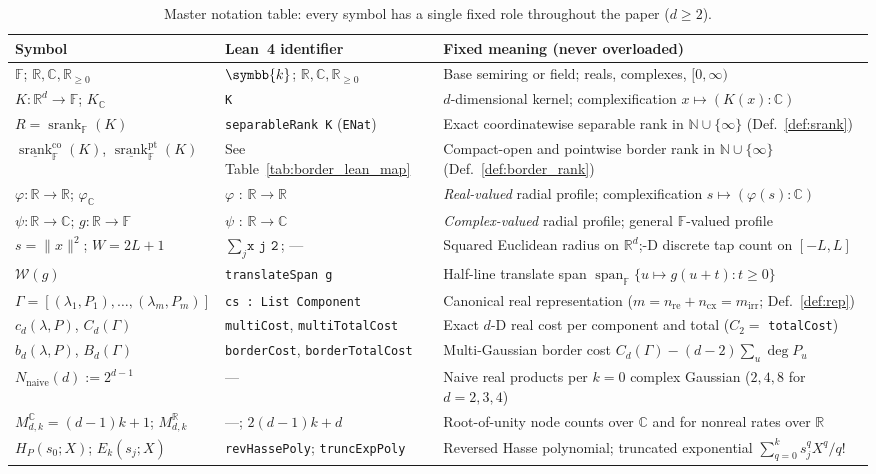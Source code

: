 \documentclass[11pt,a4paper]{article}
\theoremstyle{plain}
\theoremstyle{definition}
\newcommand{\R}{\mathbb{R}}
\newcommand{\C}{\mathbb{C}}
\newcommand{\N}{\mathbb{N}}
\newcommand{\Field}{\mathbb{F}}
\newcommand{\Rnn}{\mathbb{R}_{\ge 0}}
\newcommand{\Nnaive}{N_{\mathrm{naive}}}
\DeclareMathOperator{\srank}{srank}
\DeclareMathOperator{\spanop}{span}
\begin{document}
\begin{table}[t]
\centering
\caption{Master notation table: every symbol has a single fixed role throughout the paper ($d \ge 2$).}\label{tab:glossary}
\smallskip
{\scriptsize\setlength{\tabcolsep}{2.2pt}
\begin{tabular}{@{}ll>{\raggedright\arraybackslash}p{6.8cm}@{}}
\toprule
Symbol & Lean~4 identifier & Fixed meaning (never overloaded) \\
\midrule
$\Field$;\; $\R, \C, \Rnn$ & $\symbb{k}$;\; $\R, \C, \Rnn$ & Base semiring or field;\; reals, complexes, $[0,\infty)$ \\
$K : \R^d \to \Field$;\; $K_{\C}$ & \texttt{K} & $d$-dimensional kernel;\; complexification $x \mapsto (K(x) : \C)$ \\
$R = \srank_{\Field}(K)$ & \texttt{separableRank K} (\texttt{ENat}) & Exact coordinatewise separable rank in $\N \cup \{\infty\}$ (Def.~\ref{def:srank}) \\
$\underline{\srank}_{\Field}^{\mathrm{co}}(K)$,\; $\underline{\srank}_{\Field}^{\mathrm{pt}}(K)$ & See Table~\ref{tab:border_lean_map} & Compact-open and pointwise border rank in $\N \cup \{\infty\}$ (Def.~\ref{def:border_rank}) \\
$\varphi : \R \to \R$;\; $\varphi_{\C}$ & $\varphi\texttt{ : }\R \to \R$ & \emph{Real-valued} radial profile;\; complexification $s \mapsto (\varphi(s) : \C)$ \\
$\psi : \R \to \C$;\; $g : \R \to \Field$ & $\psi\texttt{ : }\R \to \C$ & \emph{Complex-valued} radial profile;\; general $\Field$-valued profile \\
$s = \|x\|^2$;\; $W = 2L + 1$ & $\sum_j \texttt{x j \^{} 2}$;\; --- & Squared Euclidean radius on $\R^d$;\; 1-D discrete tap count on $[-L, L]$ \\
$\mathcal{W}(g)$ & \texttt{translateSpan g} & Half-line translate span $\spanop_{\Field}\{u \mapsto g(u + t) : t \ge 0\}$ \\
$\Gamma = [(\lambda_1,P_1),\dots,(\lambda_m,P_m)]$ & \texttt{cs : List Component} & Canonical real representation ($m = n_{\mathrm{re}} + n_{\mathrm{cx}} = m_{\mathrm{irr}}$; Def.~\ref{def:rep}) \\
$c_d(\lambda, P)$,\; $C_d(\Gamma)$ & \texttt{multiCost},\; \texttt{multiTotalCost} & Exact $d$-D real cost per component and total ($C_2 =$ \texttt{totalCost}) \\
$b_d(\lambda, P)$,\; $B_d(\Gamma)$ & \texttt{borderCost},\; \texttt{borderTotalCost} & Multi-Gaussian border cost $C_d(\Gamma) - (d - 2)\sum_u \deg P_u$ \\
$\Nnaive(d) := 2^{d-1}$ & --- & Naive real products per $k{=}0$ complex Gaussian ($2, 4, 8$ for $d{=}2, 3, 4$) \\
$M_{d,k}^{\C} = (d{-}1)k{+}1$;\; $M_{d,k}^{\R}$ & ---;\; $2(d{-}1)k + d$ & Root-of-unity node counts over $\C$ and for nonreal rates over $\R$ \\
$H_P(s_0; X)$;\; $E_k(s_j; X)$ & \texttt{revHassePoly};\; \texttt{truncExpPoly} & Reversed Hasse polynomial;\; truncated exponential $\sum_{q=0}^k s_j^q X^q / q!$ \\
\bottomrule
\end{tabular}}
\end{table}
\end{document}
